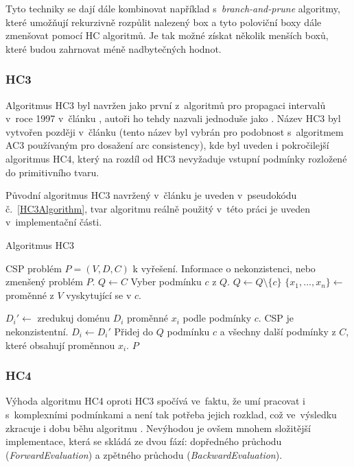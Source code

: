 Tyto techniky se dají dále kombinovat například s~\emph{branch-and-prune} algoritmy, které umožňují rekurzivně rozpůlit nalezený box a tyto poloviční boxy dále zmenšovat pomocí HC algoritmů. Je tak možné získat několik menších boxů, které budou zahrnovat méně nadbytečných hodnot.

\subsubsection{HC3}
Algoritmus HC3 byl navržen jako první z~algoritmů pro propagaci intervalů v~roce 1997 v~článku \cite{Benhamou97applyinginterval}, autoři ho tehdy nazvali jednoduše jako . Název HC3 byl vytvořen později v~článku \cite{Benhamou99revisinghull} (tento název byl vybrán pro podobnost s~algoritmem AC3 používaným pro dosažení arc consistency), kde byl uveden i pokročilejší algoritmus HC4, který na rozdíl od HC3 nevyžaduje vstupní podmínky rozložené do primitivního tvaru.
 
Původní algoritmus HC3 navržený v~článku \cite{Benhamou97applyinginterval} je uveden v~pseudokódu č.~\ref{HC3Algorithm}, tvar algoritmu reálně použitý v~této práci je uveden v~implementační části.

\begin{algorithm}
\caption{Algoritmus HC3}
\label{HC3Algorithm}
\begin{algorithmic}[1]
\Require CSP problém $P = (V, D, C)$ k vyřešení.
\Ensure Informace o nekonzistenci, nebo zmenšený problém $P$.
\State $Q \gets C$
\State Vyber podmínku $c$ z $Q$.
\State $Q \gets Q \setminus \{ c \}$
\State $\{ x_1, ..., x_n\} \gets $ proměnné z $V$ vyskytující se v $c$.

\State $D_i' \gets $ zredukuj doménu $D_i$ proměnné $x_i$ podle podmínky $c$.
\State \Return CSP je nekonzistentní.
\EndIf
{}
\State $D_i \gets D_i'$
\State Přidej do $Q$ podmínku $c$ a všechny další podmínky z $C$, které obsahují proměnnou $x_i$.
\EndIf
\EndFor
\EndWhile
\State \Return $P$
\EndProcedure
\end{algorithmic}
\end{algorithm}


\subsubsection{HC4}
Výhoda algoritmu HC4 oproti HC3 spočívá ve~faktu, že umí pracovat i s~komplexními podmínkami a není tak potřeba jejich rozklad, což ve~výsledku zkracuje i dobu běhu algoritmu \cite{Benhamou99revisinghull}. Nevýhodou je ovšem mnohem složitější implementace, která se skládá ze dvou fází: dopředného průchodu (\emph{ForwardEvaluation}) a zpětného průchodu (\emph{BackwardEvaluation}).

